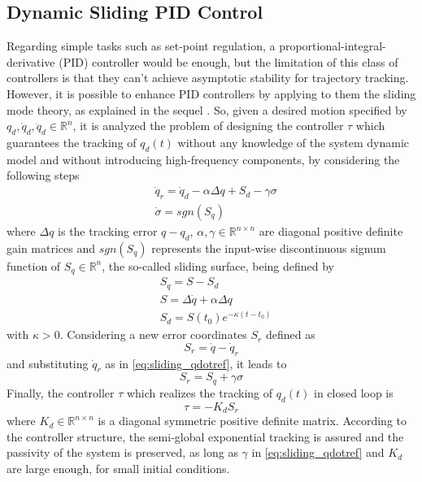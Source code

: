 \subsection{Dynamic Sliding PID Control}
Regarding simple tasks such as set-point regulation, a proportional-integral-derivative (PID) controller would be enough, but the limitation of this class of controllers is that they can't achieve asymptotic stability for trajectory tracking. However, it is possible to enhance PID controllers by applying to them the sliding mode theory, as explained in the sequel \cite{parravega03}. So, given a desired motion specified by $q_d,\dot{q}_d,\ddot{q}_d\in\mathbb{R}^n$, it is analyzed the problem of designing the controller $\tau$ which guarantees the tracking of $q_d(t)$ without any knowledge of the system dynamic model and without introducing high-frequency components, by considering the following steps
\begin{align}
&\dot{q}_r = \dot{q}_d - \alpha\Delta{q} + S_d - \gamma\sigma \label{eq:sliding_qdotref}\\
&\dot{\sigma} = sgn(S_q)
\end{align}
where $\Delta{q}$ is the tracking error $q-q_d$, $\alpha,\gamma\in\mathbb{R}^{n \times n}$ are diagonal positive definite gain matrices and $sgn(S_q)$ represents the input-wise discontinuous signum function of $S_q\in\mathbb{R}^n$, the so-called sliding surface, being defined by
\begin{align}
&S_q = S - S_d\\
&S = \Delta{\dot{q}} + \alpha\Delta{q}\\
&S_d = S(t_0)e^{-\kappa(t-t_0)}
\end{align}
with $\kappa > 0$.
Considering a new error coordinates $S_r$ defined as
\begin{equation}
S_r = \dot{q} - \dot{q}_r
\end{equation}
and substituting $\dot{q}_r$ as in \eqref{eq:sliding_qdotref}, it leads to
\begin{equation}
S_r = S_q + \gamma\sigma
\end{equation}
Finally, the controller $\tau$ which realizes the tracking of $q_d(t)$ in closed loop is
\begin{equation}
\tau = -K_{d}S_r
\end{equation}
where $K_d\in\mathbb{R}^{n \times n}$ is a diagonal symmetric positive definite matrix. According to the controller structure, the semi-global exponential tracking is assured and the passivity of the system is preserved, as long as $\gamma$ in \eqref{eq:sliding_qdotref} and $K_d$ are large enough, for small initial conditions.

